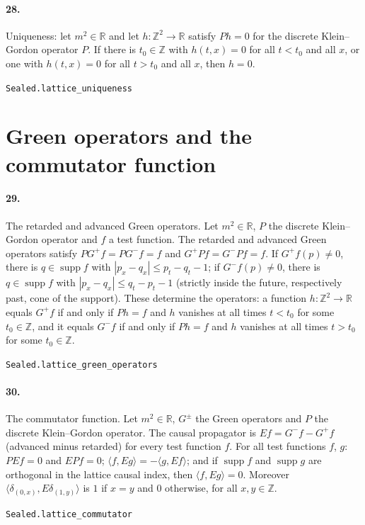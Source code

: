 \documentclass[11pt]{article}
\begin{document}
\paragraph{28.} Uniqueness: let $m^2 \in \mathbb R$ and let $h : \mathbb Z^2 \to \mathbb R$ satisfy $Ph = 0$ for the discrete Klein–Gordon operator $P$. If there is $t_0 \in \mathbb Z$ with $h(t, x) = 0$ for all $t < t_0$ and all $x$, or one with $h(t, x) = 0$ for all $t > t_0$ and all $x$, then $h = 0$.\par{\footnotesize\texttt{Sealed.lattice\_uniqueness}}

\section*{Green operators and the commutator function}
\paragraph{29.} The retarded and advanced Green operators. Let $m^2 \in \mathbb R$, $P$ the discrete Klein–Gordon operator and $f$ a test function. The retarded and advanced Green operators satisfy $P G^+ f = P G^- f = f$ and $G^+ P f = G^- P f = f$. If $G^+ f(p) \ne 0$, there is $q \in \operatorname{supp} f$ with $|p_x - q_x| \le p_t - q_t - 1$; if $G^- f(p) \ne 0$, there is $q \in \operatorname{supp} f$ with $|p_x - q_x| \le q_t - p_t - 1$ (strictly inside the future, respectively past, cone of the support). These determine the operators: a function $h : \mathbb Z^2 \to \mathbb R$ equals $G^+ f$ if and only if $P h = f$ and $h$ vanishes at all times $t < t_0$ for some $t_0 \in \mathbb Z$, and it equals $G^- f$ if and only if $P h = f$ and $h$ vanishes at all times $t > t_0$ for some $t_0 \in \mathbb Z$.\par{\footnotesize\texttt{Sealed.lattice\_green\_operators}}

\paragraph{30.} The commutator function. Let $m^2 \in \mathbb R$, $G^\pm$ the Green operators and $P$ the discrete Klein–Gordon operator. The causal propagator is $E f = G^- f - G^+ f$ (advanced minus retarded) for every test function $f$. For all test functions $f$, $g$: $P E f = 0$ and $E P f = 0$; $\langle f, E g \rangle = -\langle g, E f \rangle$; and if $\operatorname{supp} f$ and $\operatorname{supp} g$ are orthogonal in the lattice causal index, then $\langle f, E g \rangle = 0$. Moreover $\langle \delta_{(0, x)}, E \delta_{(1, y)} \rangle$ is $1$ if $x = y$ and $0$ otherwise, for all $x, y \in \mathbb Z$.\par{\footnotesize\texttt{Sealed.lattice\_commutator}}
\end{document}
